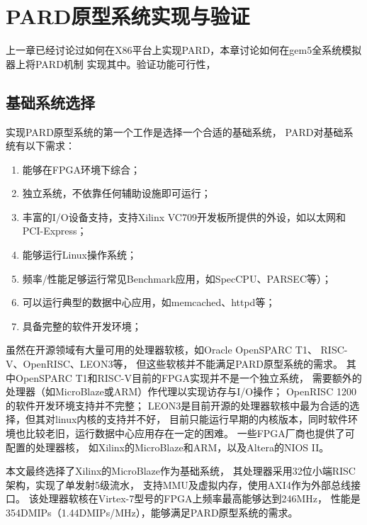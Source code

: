 

\chapter{PARD原型系统实现与验证}
\label{chap:impl}

上一章已经讨论过如何在X86平台上实现PARD，本章讨论如何在gem5全系统模拟器上将PARD机制
实现其中。验证功能可行性，


\section{基础系统选择}

实现PARD原型系统的第一个工作是选择一个合适的基础系统，
PARD对基础系统有以下需求：

\begin{enumerate}
  \item 能够在FPGA环境下综合；
  \item 独立系统，不依靠任何辅助设施即可运行；
  \item 丰富的I/O设备支持，支持Xilinx VC709开发板所提供的外设，如以太网和PCI-Express；
  \item 能够运行Linux操作系统；
  \item 频率/性能足够运行常见Benchmark应用，如SpecCPU、PARSEC等）；
  \item 可以运行典型的数据中心应用，如memcached、httpd等；
  \item 具备完整的软件开发环境；
\end{enumerate}

虽然在开源领域有大量可用的处理器软核，如Oracle OpenSPARC T1\cite{sparct1}、
RISC-V\cite{riscv}、OpenRISC\cite{or1k}、LEON3\cite{leon3}等，
但这些软核并不能满足PARD原型系统的需求。
其中OpenSPARC T1和RISC-V目前的FPGA实现并不是一个独立系统，
需要额外的处理器（如MicroBlaze或ARM）作代理以实现访存与I/O操作；
OpenRISC 1200的软件开发环境支持并不完整；
LEON3是目前开源的处理器软核中最为合适的选择，但其对linux内核的支持并不好，
目前只能运行早期的内核版本，同时软件环境也比较老旧，运行数据中心应用存在一定的困难。
一些FPGA厂商也提供了可配置的处理器核，
如Xilinx的MicroBlaze\cite{microblaze}和ARM\cite{zynq}，以及Altera的NIOS II\cite{niosii}。

本文最终选择了Xilinx的MicroBlaze作为基础系统，
其处理器采用32位小端RISC架构，实现了单发射5级流水，
支持MMU及虚拟内存，使用AXI4作为外部总线接口\cite{microblaze-ref}。
该处理器软核在Virtex-7型号的FPGA上频率最高能够达到246MHz，
性能是354DMIPs（1.44DMIPs/MHz）\cite{microblaze}，能够满足PARD原型系统的需求。

